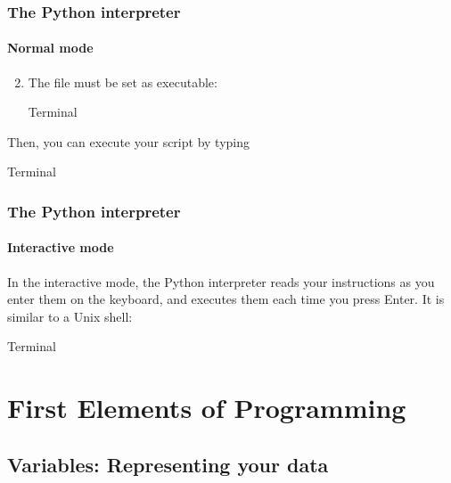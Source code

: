 \documentclass[handout]{beamer}
\def\prompt{>\hspace{-1pt}>\hspace{-1pt}>\/}
\begin{document}
\begin{frame}[fragile]
	\frametitle{The Python interpreter}
	\framesubtitle{Normal mode}

	\begin{enumerate}
		\setcounter{enumi}{1}
		\item The file must be set as executable:
			\begin{block}{Terminal}
			\end{block}
	\end{enumerate}

	\pause
	\bigskip
	Then, you can execute your script by typing
	\begin{block}{Terminal}
	\end{block}
\end{frame}

\begin{frame}[fragile]
	\frametitle{The Python interpreter}
	\framesubtitle{Interactive mode}
	In the interactive mode, the Python interpreter reads your instructions as you enter them on the keyboard, and executes them each time you press Enter. It is similar to a Unix shell:

	\medskip
	\begin{block}{Terminal}
	\end{block}
\end{frame}


\section{First Elements of Programming}

\subsection[Variables: Representing your data]{Variables: Representing your data}
\end{document}
